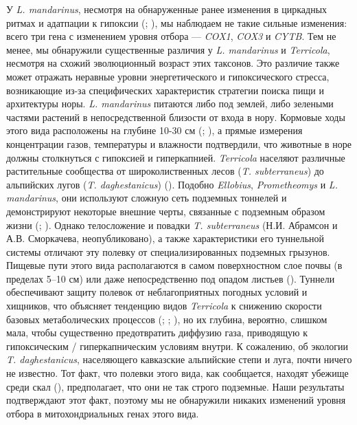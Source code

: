 У \textit{L. mandarinus}, несмотря на обнаруженные ранее изменения в циркадных ритмах и адатпации к гипоксии (\cite{Sun2018}; \cite{Dong2020}), мы наблюдаем не такие сильные изменения: всего три гена с изменением уровня отбора --- \textit{COX1}, \textit{COX3} и \textit{CYTB}. Тем не менее, мы обнаружили существенные различия у \textit{L. mandarinus} и \textit{Terricola}, несмотря на схожий эволюционный возраст этих таксонов. Это различие также может отражать неравные уровни энергетического и гипоксического стресса, возникающие из-за специфических характеристик стратегии поиска пищи и архитектуры норы. \textit{L. mandarinus} питаются либо под землей, либо зелеными частями растений в непосредственной близости от входа в нору. Кормовые ходы этого вида расположены на глубине 10-30 см (\cite{Smorkatcheva1990}; \cite{Hong2019}), а прямые измерения концентрации газов, температуры и влажности подтвердили, что животные в норе должны столкнуться с гипоксией и гиперкапнией. \textit{Terricola} населяют различные растительные сообщества от широколиственных лесов (\textit{T. subterraneus}) до альпийских лугов (\textit{T. daghestanicus}) (\cite{Aulagnier2018}). Подобно \textit{Ellobius}, \textit{Prometheomys} и \textit{L. mandarinus}, они используют сложную сеть подземных тоннелей и демонстрируют некоторые внешние черты, связанные с подземным образом жизни (\cite{Aulagnier2018}; \cite{Mironov2020}). Однако телосложение и повадки \textit{T. subterraneus} (Н.И. Абрамсон и А.В. Сморкачева, неопубликовано), а также характеристики его туннельной системы отличают эту полевку от специализированных подземных грызунов. Пищевые пути этого вида располагаются в самом поверхностном слое почвы (в пределах 5--10 см) или даже непосредственно под опадом листьев (\cite{Mironov2020}). Туннели обеспечивают защиту полевок от неблагоприятных погодных условий и хищников, что объясняет тенденцию видов \textit{Terricola} к снижению скорости базовых метаболических процессов (\cite{Caroli2000}; \cite{Jemiolo1983}; \cite{Schropfer1977}), но их глубина, вероятно, слишком мала, чтобы существенно предотвратить диффузию газа, приводящую к гипоксическим / гиперкапническим условиям внутри. К сожалению, об экологии \textit{T. daghestanicus}, населяющего кавказские альпийские степи и луга, почти ничего не известно. Тот факт, что полевки этого вида, как сообщается, находят убежище среди скал (\cite{Krystufek2005}), предполагает, что они не так строго подземные. Наши результаты подтверждают этот факт, поэтому мы не обнаружили никаких изменений уровня отбора в митохондриальных генах этого вида. 

